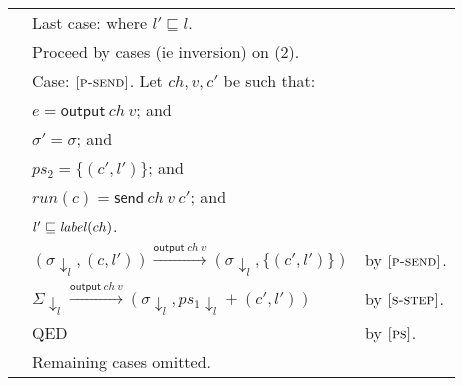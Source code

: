 \documentclass{article}
\newcommand{\rn}[1]{\text{\textsc{[#1]}}}
\newcommand{\tsteparrow}[1]{\overset{#1}{\longrightarrow}}
\newcommand{\tstep}[3]{#2\tsteparrow{#1}#3}
\newcommand{\ssteparrow}[1]{\overset{#1}{\longrightarrow}}
\newcommand{\sstep}[3]{#2\ssteparrow{#1}#3}
\newcommand{\s}[1]{\text{\textit{#1}}}
\newcommand{\process}[2]{(#1,#2)}
\newcommand{\opsend}[3]{\textsf{send}~#1~#2~#3}
\newcommand{\evsend}[2]{\textsf{output}~#1~#2}
\newcommand{\proj}[2]{#1{\downarrow_{#2}}}
\begin{document}
\begin{tabular}{l@{$\qquad$}l@{$\qquad$}l}
        & Last case: where $l'\sqsubseteq l$.
\\
        & Proceed by cases (ie inversion) on (2).
\\
        & Case: $\rn{p-send}$. Let $ch,v,c'$ be such that:
\\
        & \z $e=\evsend{ch}{v}$; and
\\
        & \z $\sigma'=\sigma$; and
\\
        & \z $ps_2=\{\process{c'}{l'}\}$; and
\\
        & \z $run(c)=\opsend{ch}{v}{c'}$; and
\\
        & \z $l'\sqsubseteq\s{label}(ch)$.
\\
        & \z $\tstep{\evsend{ch}{v}}{(\proj{\sigma}{l},\process{c}{l'})}{(\proj{\sigma}{l},\{\process{c'}{l'}\})}$
        & by $\rn{p-send}$.
\\
        & \z $\sstep{\evsend{ch}{v}}{\proj{\Sigma}{l}}{(\proj{\sigma}{l},\proj{ps_1}{l}+\process{c'}{l'})}$
        & by $\rn{s-step}$.
\\
        & \z QED
        & by $\rn{ps}$.
\\
        & Remaining cases omitted.
\end{tabular}
\end{document}
